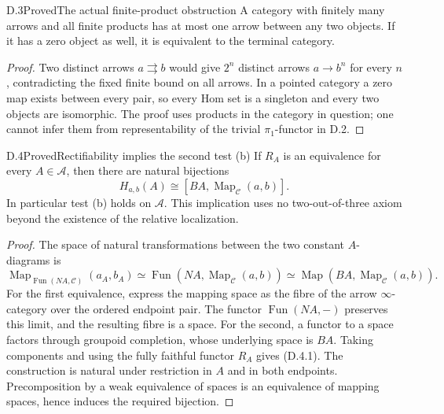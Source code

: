 \begin{result}{D.3}{Proved}{The actual finite-product obstruction}
A category with finitely many arrows and all finite products has at
most one arrow between any two objects. If it has a zero object as
well, it is equivalent to the terminal category.
\end{result}
\begin{proof}
Two distinct arrows $a\rightrightarrows b$ would give $2^n$ distinct
arrows $a\to b^n$ for every $n$, contradicting the fixed finite bound
on all arrows. In a pointed category a zero map exists between every
pair, so every Hom set is a singleton and every two objects are
isomorphic. The proof uses products in the category in question;
one cannot infer them from representability of the trivial
$\pi_1$-functor in D.2.
\end{proof}

\begin{result}{D.4}{Proved}{Rectifiability implies the second test (b)}
If $R_A$ is an equivalence for every $A\in\mathscr A$, then there are
natural bijections
\[
 H_{a,b}(A)\cong[BA,\operatorname{Map}_{\mathcal C}(a,b)].          \tag{D.4.1}
\]
In particular test (b) holds on $\mathscr A$. This implication uses
no two-out-of-three axiom beyond the existence of the relative
localization.
\end{result}
\begin{proof}
The space of natural transformations between the two constant
$A$-diagrams is
\[
 \operatorname{Map}_{\operatorname{Fun}(NA,\mathcal C)}
       (a_A,b_A)
 \simeq\operatorname{Fun}(NA,\operatorname{Map}_{\mathcal C}(a,b))
 \simeq\operatorname{Map}(BA,\operatorname{Map}_{\mathcal C}(a,b)).
\]
For the first equivalence, express the mapping space as the fibre of
the arrow $\infty$-category over the ordered endpoint pair.
The functor $\operatorname{Fun}(NA,-)$ preserves this limit, and the
resulting fibre is a space. For the second, a functor to a space factors
through groupoid completion, whose underlying space is $BA$.
Taking components and using the fully faithful functor $R_A$ gives
(D.4.1). The construction is natural under restriction in $A$ and in
both endpoints. Precomposition by a weak equivalence of spaces is an
equivalence of mapping spaces, hence induces the required bijection.
\end{proof}

